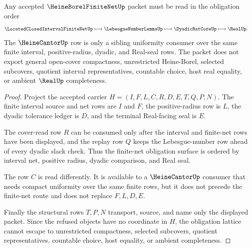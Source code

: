 \begin{theorem}
\label{thm:heine-borel-finite-net-obligation-lattice}
Any accepted $\HeineBorelFiniteNetUp$ packet must be read in the obligation order
$$
\LocatedClosedIntervalFiniteNetUp \longmapsto \LebesgueNumberLemmaUp \longmapsto \DyadicRatCoreUp \longmapsto \RealUp .
$$
The $\HeineCantorUp$ row is only a sibling uniformity consumer over the same finite interval, positive-radius, dyadic, and Real-seal rows. The packet does not export general open-cover compactness, unrestricted Heine-Borel, selected subcovers, quotient interval representatives, countable choice, host real equality, or ambient $\RealUp$ completeness.
\end{theorem}
\begin{proof}
Project the accepted carrier $H=(I,F,L,C,R,D,E,T,Q,P,N)$. The finite interval source and net rows are $I$ and $F$, the positive-radius row is $L$, the dyadic tolerance ledger is $D$, and the terminal Real-facing seal is $E$.

The cover-read row $R$ can be consumed only after the interval and finite-net rows have been displayed, and the replay row $Q$ keeps the Lebesgue-number row ahead of every dyadic slack check. Thus the finite-net obligation surface is ordered by interval net, positive radius, dyadic comparison, and Real seal.

The row $C$ is read differently. It is available to a $\HeineCantorUp$ consumer that needs compact uniformity over the same finite rows, but it does not precede the finite-net route and does not replace $F,L,D,E$.

Finally the structural rows $T,P,N$ transport, source, and name only the displayed packet. Since the refused objects have no coordinate in $H$, the obligation lattice cannot escape to unrestricted compactness, selected subcovers, quotient representatives, countable choice, host equality, or ambient completeness.
\end{proof}


